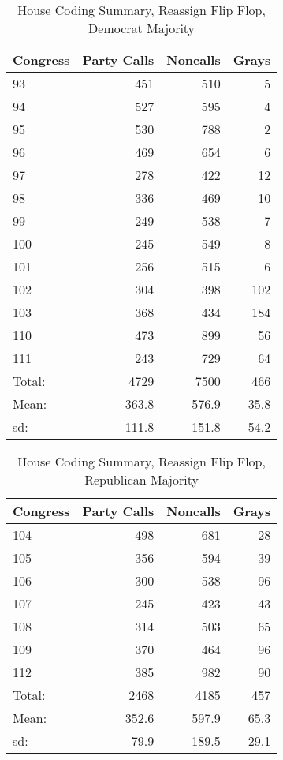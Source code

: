 \documentclass[12pt]{article}
\begin{document}
\begin{table}[ht]
	\caption{House Coding Summary, Reassign Flip Flop, Democrat Majority}
	\centering
	\begin{tabular}{lrrr}
		\hline
		Congress & Party Calls & Noncalls & Grays \\ 
		\hline
		93 & 451 & 510 &   5 \\ 
		94 & 527 & 595 &   4 \\ 
		95 & 530 & 788 &   2 \\ 
		96 & 469 & 654 &   6 \\ 
		97 & 278 & 422 &  12 \\ 
		98 & 336 & 469 &  10 \\ 
		99 & 249 & 538 &   7 \\ 
		100 & 245 & 549 &   8 \\ 
		101 & 256 & 515 &   6 \\ 
		102 & 304 & 398 & 102 \\ 
		103 & 368 & 434 & 184 \\ 
		110 & 473 & 899 &  56 \\ 
		111 & 243 & 729 &  64 \\ 
		\hline
		Total: & 4729 & 7500 & 466 \\
		Mean: & 363.8 & 576.9 & 35.8 \\
		sd: & 111.8 & 151.8 & 54.2 \\
		\hline
	\end{tabular}
\end{table}

\begin{table}[ht]
	\caption{House Coding Summary, Reassign Flip Flop, Republican Majority}
	\centering
	\begin{tabular}{lrrr}
		\hline
		Congress & Party Calls & Noncalls & Grays \\ 
		\hline
		 104 & 498 & 681 &  28 \\ 
		 105 & 356 & 594 &  39 \\ 
		 106 & 300 & 538 &  96 \\ 
		 107 & 245 & 423 &  43 \\ 
		 108 & 314 & 503 &  65 \\ 
		 109 & 370 & 464 &  96 \\ 
		 112 & 385 & 982 &  90 \\
		\hline
		Total: & 2468 & 4185 & 457 \\
		Mean: & 352.6 & 597.9 & 65.3 \\
		sd: & 79.9 & 189.5 & 29.1 \\
		\hline
	\end{tabular}
\end{table}
\end{document}
